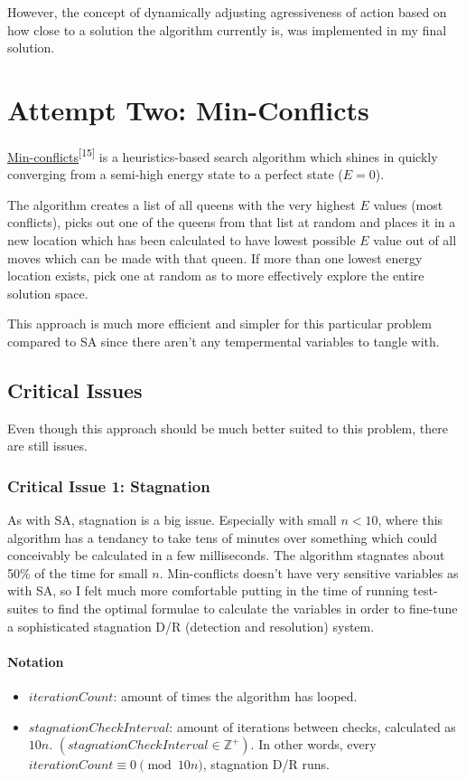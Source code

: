 \documentclass{article}
\begin{document}
However, the concept of dynamically adjusting agressiveness of action based on how close
to a solution the algorithm currently is, was implemented in my final solution.

\section{Attempt Two: Min-Conflicts}
\href{https://en.wikipedia.org/wiki/Min-conflicts_algorithm}{Min-conflicts}\textsuperscript{[15]}
is a heuristics-based search algorithm which shines in quickly converging from a semi-high energy state to a perfect state (\(E = 0\)).

The algorithm creates a list of all queens with the very highest \(E\) values (most conflicts),
picks out one of the queens from that list at random and places it in a new location
which has been calculated to have lowest possible \(E\) value out of all moves which can be made with that queen.
If more than one lowest energy location exists, pick one at random as to more effectively explore the entire solution space.

This approach is much more efficient and simpler for this particular problem compared to SA since there aren't any tempermental variables to tangle with.

\subsection{Critical Issues}
Even though this approach should be much better suited to this problem, there are still issues.

\subsubsection{Critical Issue 1: Stagnation}
As with SA, stagnation is a big issue. Especially with small \(n<10\), where this algorithm has a tendancy to take tens of minutes
over something which could conceivably be calculated in a few milliseconds.
The algorithm stagnates about 50\% of the time for small \(n\).
Min-conflicts doesn't have very sensitive variables as with SA,
so I felt much more comfortable putting in the time of running test-suites to find the optimal formulae to calculate the variables
in order to fine-tune a sophisticated stagnation D/R (detection and resolution) system.

\paragraph{Notation}
\begin{itemize}

    \item \(iterationCount\): amount of times the algorithm has looped.
    \item \(stagnationCheckInterval\): amount of iterations between checks, calculated as \(10n\).
          \newline \((stagnationCheckInterval \in \mathbb{Z}^+)\).
          \newline In other words, every \(iterationCount \equiv 0 \pmod{10n}\), stagnation D/R runs.
\end{itemize}
\end{document}
